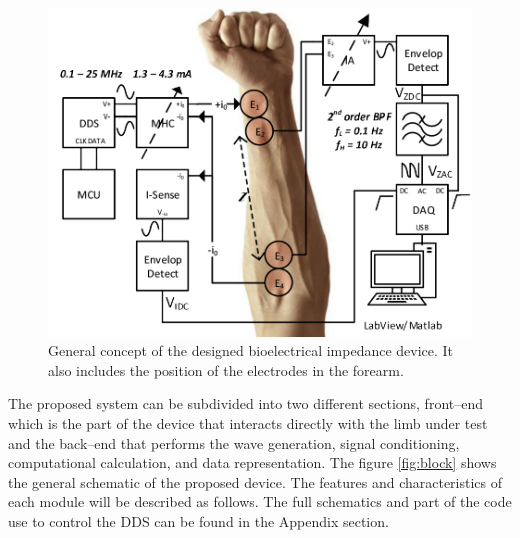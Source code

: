 \begin{figure}[!htpb]
	\centering
	\includegraphics[width=12cm,keepaspectratio]{figure1}	
    \caption[General concept of the designed bioelectrical impedance device]{General concept of the designed bioelectrical impedance device. It also includes the position of the electrodes in the forearm.}
    \label{fig:electrode}
\end{figure}

The proposed system can be subdivided into two different sections, front–end which is the part of the device that interacts directly with the limb under test and the back–end that performs the wave generation, signal conditioning, computational calculation, and data representation. The figure \ref{fig:block} shows the general schematic of the proposed device. The features and characteristics of each module will be described as follows. The full schematics and part of the code use to control the DDS can be found in the Appendix section.



